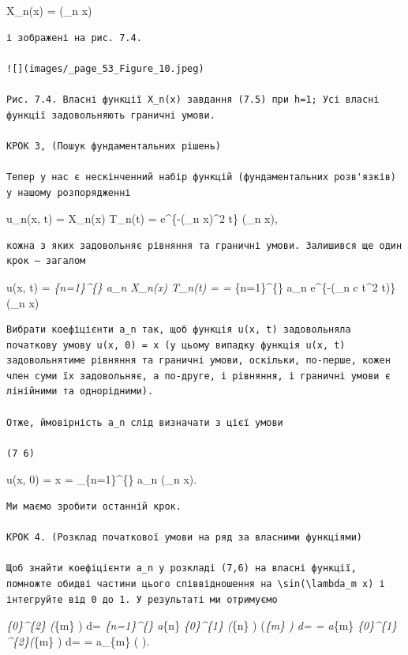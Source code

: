 \documentclass[
  ukrainian,
]{article}
\begin{document}
X\_n(x) = \sin(\lambda\_n x)

\begin{verbatim}
і зображені на рис. 7.4.

![](images/_page_53_Figure_10.jpeg)

Рис. 7.4. Власні функції X_n(x) завдання (7.5) при h=1; Усі власні функції задовольняють граничні умови.

КРОК 3, (Пошук фундаментальних рішень)

Тепер у нас є нескінченний набір функцій (фундаментальних розв'язків) у нашому розпорядженні
\end{verbatim}

u\_n(x, t) = X\_n(x) T\_n(t) = e\^{}\{-(\lambda\_n x)\^{}2 t\}
\sin(\lambda\_n x),

\begin{verbatim}
кожна з яких задовольняє рівняння та граничні умови. Залишився ще один крок — загалом
\end{verbatim}

u(x, t) = \sum\emph{\{n=1\}\^{}\{\infty\} a\_n X\_n(x) T\_n(t) = =
\sum}\{n=1\}\^{}\{\infty\} a\_n e\^{}\{-(\lambda\_n c t\^{}2 t)\}
\sin(\lambda\_n x)

\begin{verbatim}
Вибрати коефіцієнти a_n так, щоб функція u(x, t) задовольняла початкову умову u(x, 0) = x (у цьому випадку функція u(x, t) задовольнятиме рівняння та граничні умови, оскільки, по-перше, кожен член суми їх задовольняє, а по-друге, і рівняння, і граничні умови є лінійними та однорідними).

Отже, ймовірність a_n слід визначати з цієї умови

(7 6)
\end{verbatim}

u(x, 0) = x = \sum\_\{n=1\}\^{}\{\infty\} a\_n \sin(\lambda\_n x).

\begin{verbatim}
Ми маємо зробити останній крок.

КРОК 4. (Розклад початкової умови на ряд за власними функціями)

Щоб знайти коефіцієнти a_n у розкладі (7,6) на власні функції, помножте обидві частини цього співвідношення на \sin(\lambda_m x) і інтегруйте від 0 до 1. У результаті ми отримуємо
\end{verbatim}

\int\emph{\{0\}\^{}\{2\} \xi \sin(\lambda}\{m\} \xi) d\xi =
\sum\emph{\{n=1\}\^{}\{\infty\} a}\{n\} \int\emph{\{0\}\^{}\{1\}
\sin(\lambda}\{n\} \xi) \sin(\lambda\emph{\{m\} \xi) d\xi = = a}\{m\}
\int\emph{\{0\}\^{}\{1\} \sin\^{}\{2\}(\lambda}\{m\} \xi) d\xi = =
a\_\{m\} \left(
\right).
\end{document}
